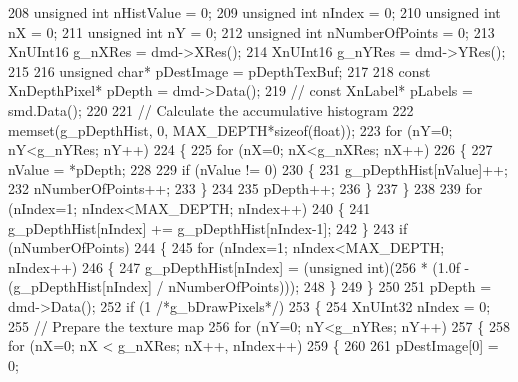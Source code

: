 \begin{DoxyCode}
{{208         \textcolor{keywordtype}{unsigned} \textcolor{keywordtype}{int} nHistValue = 0;
209         \textcolor{keywordtype}{unsigned} \textcolor{keywordtype}{int} nIndex = 0;
210         \textcolor{keywordtype}{unsigned} \textcolor{keywordtype}{int} nX = 0;
211         \textcolor{keywordtype}{unsigned} \textcolor{keywordtype}{int} nY = 0;
212         \textcolor{keywordtype}{unsigned} \textcolor{keywordtype}{int} nNumberOfPoints = 0;
213         XnUInt16 g\_nXRes = dmd->XRes();
214         XnUInt16 g\_nYRes = dmd->YRes();
215 
216         \textcolor{keywordtype}{unsigned} \textcolor{keywordtype}{char}* pDestImage = pDepthTexBuf;
217 
218         \textcolor{keyword}{const} XnDepthPixel* pDepth = dmd->Data();
219 \textcolor{comment}{//         const XnLabel* pLabels = smd.Data();}
220 
221         \textcolor{comment}{// Calculate the accumulative histogram}
222         memset(g\_pDepthHist, 0, MAX\_DEPTH*\textcolor{keyword}{sizeof}(\textcolor{keywordtype}{float}));
223         \textcolor{keywordflow}{for} (nY=0; nY<g\_nYRes; nY++)
224         \{
225                 \textcolor{keywordflow}{for} (nX=0; nX<g\_nXRes; nX++)
226                 \{
227                         nValue = *pDepth;
228 
229                         \textcolor{keywordflow}{if} (nValue != 0)
230                         \{
231                                 g\_pDepthHist[nValue]++;
232                                 nNumberOfPoints++;
233                         \}
234 
235                         pDepth++;
236                 \}
237         \}
238 
239         \textcolor{keywordflow}{for} (nIndex=1; nIndex<MAX\_DEPTH; nIndex++)
240         \{
241                 g\_pDepthHist[nIndex] += g\_pDepthHist[nIndex-1];
242         \}
243         \textcolor{keywordflow}{if} (nNumberOfPoints)
244         \{
245                 \textcolor{keywordflow}{for} (nIndex=1; nIndex<MAX\_DEPTH; nIndex++)
246                 \{
247                         g\_pDepthHist[nIndex] = (\textcolor{keywordtype}{unsigned} int)(256 * (1.0f - (g\_pDepthHist[nIndex] / 
      nNumberOfPoints)));
248                 \}
249         \}
250 
251         pDepth = dmd->Data();
252         \textcolor{keywordflow}{if} (1 \textcolor{comment}{/*g\_bDrawPixels*/})
253         \{
254                 XnUInt32 nIndex = 0;
255                 \textcolor{comment}{// Prepare the texture map}
256                 \textcolor{keywordflow}{for} (nY=0; nY<g\_nYRes; nY++)
257                 \{
258                         \textcolor{keywordflow}{for} (nX=0; nX < g\_nXRes; nX++, nIndex++)
259                         \{
260 
261                                 pDestImage[0] = 0;
}}
\end{DoxyCode}

